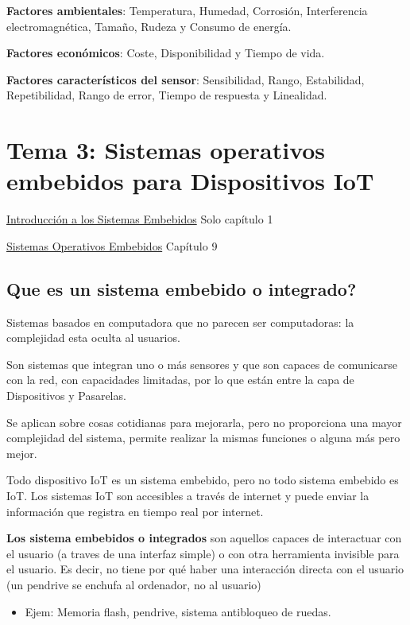 \documentclass[12pt]{report} %
\begin{document}
\textbf{Factores ambientales}: Temperatura, Humedad, Corrosión,
Interferencia electromagnética, Tamaño, Rudeza y Consumo de energía.

\textbf{Factores económicos}: Coste, Disponibilidad y Tiempo de vida.

\textbf{Factores característicos del sensor}: Sensibilidad, Rango,
Estabilidad, Repetibilidad, Rango de error, Tiempo de respuesta y
Linealidad.

\chapter{Tema 3: Sistemas operativos embebidos para Dispositivos
IoT}

\href{https://aulaglobal.uc3m.es/mod/url/view.php?id=3123882}{Introducción
a los Sistemas Embebidos} Solo capítulo 1

\href{https://aulaglobal.uc3m.es/mod/url/view.php?id=3123883}{Sistemas
Operativos Embebidos} Capítulo 9

\section{Que es un sistema embebido o
integrado?}

Sistemas basados en computadora que no parecen ser computadoras: la complejidad esta oculta al usuarios.

Son sistemas que integran uno o más sensores y que son capaces de
comunicarse con la red, con capacidades limitadas, por lo que están
entre la capa de Dispositivos y Pasarelas.

Se aplican sobre cosas cotidianas para mejorarla, pero no
proporciona una mayor complejidad del sistema, permite realizar la
mismas funciones o alguna más pero mejor.

Todo dispositivo IoT es un sistema embebido, pero no todo sistema
embebido es IoT. Los sistemas IoT son accesibles a través de internet y
puede enviar la información que registra en tiempo real por internet.

\textbf{Los sistema embebidos o integrados} son aquellos capaces de
interactuar con el usuario (a traves de  una interfaz simple) o con otra herramienta invisible para el usuario. Es decir, no tiene por qué haber una interacción directa con el usuario (un pendrive se enchufa al ordenador, no al usuario)

\begin{itemize}

\item
  Ejem: Memoria flash, pendrive, sistema antibloqueo de ruedas.
\end{itemize}
\end{document}
